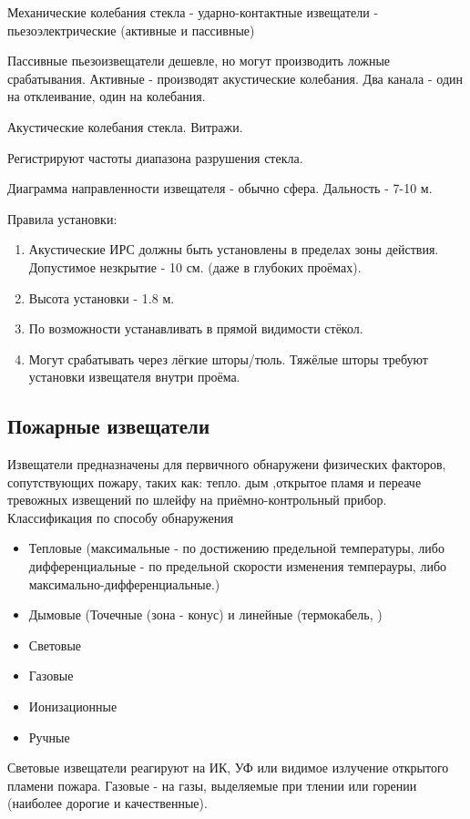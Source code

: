 \documentclass[a4paper,12pt]{report}
\begin{document}
	Механические колебания стекла - ударно-контактные извещатели - пьезоэлектрические (активные и пассивные)

	Пассивные пьезоизвещатели дешевле, но могут производить ложные срабатывания.
	Активные - производят акустические колебания. Два канала - один на отклеивание, один на колебания.


	Акустические колебания стекла. Витражи.

	Регистрируют частоты диапазона разрушения стекла.

	Диаграмма направленности извещателя - обычно сфера. Дальность - 7-10 м.

	Правила установки:
	\begin{enumerate}
	\item	Акустические ИРС должны быть установлены в пределах зоны действия. Допустимое незкрытие - 10 см. (даже в глубоких проёмах).
	\item	Высота установки - 1.8 м.
	\item	По возможности устанавливать в прямой видимости стёкол.
	\item	Могут срабатывать через лёгкие шторы/тюль. Тяжёлые шторы требуют установки извещателя внутри проёма.
	\end{enumerate}





	\subsection{Пожарные извещатели}

	Извещатели предназначены для первичного обнаружени физических факторов, сопутствующих пожару, таких как: тепло. дым ,открытое пламя и переаче тревожных извещений по шлейфу на приёмно-контрольный прибор.
	Классификация по способу обнаружения
	\begin{itemize}
	\item 	Тепловые (максимальные - по достижению предельной температуры, либо дифференциальные - по предельной скорости изменения темперауры, либо максимально-дифференциальные.)
	\item 	Дымовые (Точечные (зона - конус) и линейные (термокабель, )
	\item 	Световые
	\item 	Газовые
	\item 	Ионизационные
	\item 	Ручные
	\end{itemize}

	Световые извещатели реагируют на ИК, УФ или видимое излучение открытого пламени пожара.
	Газовые - на газы, выделяемые при тлении или горении (наиболее дорогие и качественные).
\end{document}
